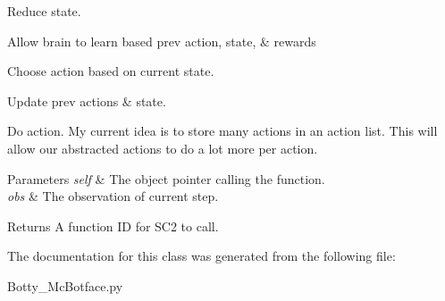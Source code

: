 \begin{DoxyEnumerate}
\item Reduce state.
\begin{DoxyEnumerate}
\item Allow brain to learn based prev action, state, \& rewards
\item Choose action based on current state.
\item Update prev actions \& state.
\item Do action. My current idea is to store many actions in an action list. This will allow our abstracted actions to do a lot more per action. 
\begin{DoxyParams}{Parameters}
{\em self} & The object pointer calling the function. \\
\hline
{\em obs} & The observation of current step. \\
\hline
\end{DoxyParams}
\begin{DoxyReturn}{Returns}
A function ID for S\+C2 to call. 
\end{DoxyReturn}

\end{DoxyEnumerate}
\end{DoxyEnumerate}

The documentation for this class was generated from the following file\+:\begin{DoxyCompactItemize}
\item 
Botty\+\_\+\+Mc\+Botface.\+py\end{DoxyCompactItemize}
